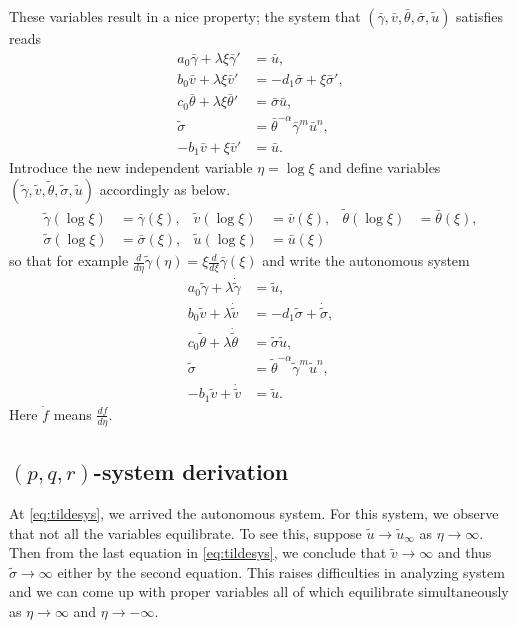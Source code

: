 \documentclass[a4paper,11pt]{article}
\def\bg{{\bar{\gamma}}}
\def\bv{{\bar{v}}}
\def\bth{{\bar{\theta}}}
\def\bs{{\bar{\sigma}}}
\def\bu{{\bar{u}}}
\def\tg{{\tilde{\gamma}}}
\def\tv{{\tilde{v}}}
\def\tth{{\tilde{\theta}}}
\def\ts{{\tilde{\sigma}}}
\def\tu{{\tilde{u}}}
\def\dtg{{\dot{\tilde{\gamma}}}}
\def\dtv{{\dot{\tilde{v}}}}
\def\dtth{{\dot{\tilde{\theta}}}}
\def\dts{{\dot{\tilde{\sigma}}}}
\begin{document}
These variables result in a nice property; the system that $(\bg,\bv,\bth,\bs,\tu)$ satisfies reads
\begin{equation} \label{eq:barsys}
 \begin{aligned}
  a_0\bg + \lambda\xi\bg' &=\bu,\\
  b_0\bv + \lambda\xi\bv' &=-d_1 \bs + \xi\bs',\\
  c_0\bth+ \lambda\xi\bth'&=\bs\bu,\\
  \ts &=\bth^{-\alpha}\bg^m\bu^n,\\
  -b_1\bv+\xi\bv' &= \bu.
 \end{aligned}
\end{equation}
Introduce the new independent variable $\eta = \log\xi$ and define variables $(\tg,\tv,\tth,\ts,\tu)$ accordingly as below.
\begin{equation} \label{eq:BARtoTIL}
\begin{aligned}
 \tg(\log\xi)&=\bg(\xi), &
 \tv(\log\xi)&=\bv(\xi), &
 \tth(\log\xi)&=\bth(\xi), \\
 \ts(\log\xi)&=\bs(\xi), &
 \tu(\log\xi)&=\bu(\xi)
\end{aligned}
\end{equation}
so that for example $\frac{d}{d\eta}\tg(\eta) = \xi \frac{d}{d\xi}\bg(\xi)$ and write the autonomous system
\begin{equation} \label{eq:tildesys}
 \begin{aligned}
  a_0\tg + \lambda\dtg &=\tu,\\
  b_0\tv + \lambda\dtv &=-d_1 \ts + \dts,\\
  c_0\tth+ \lambda\dtth&=\ts\tu,\\
  \ts &=\tth^{-\alpha}\tg^m\tu^n,\\
  -b_1\tv+\dtv &= \tu.
 \end{aligned}
\end{equation}
Here $\dot{f}$ means $\frac{df}{d\eta}$.



\subsection{$(p,q,r)$-system derivation}
At \eqref{eq:tildesys}, we arrived the autonomous system. For this system, we observe that not all the variables equilibrate. To see this, suppose $\tu \rightarrow \tu_\infty$ as $\eta \rightarrow \infty$. Then from the last equation in \eqref{eq:tildesys}, we conclude that $\tv \rightarrow \infty$ and thus $\ts \rightarrow \infty$ either by the second equation. This raises difficulties in analyzing system and we can come up with proper variables all of which equilibrate simultaneously as $\eta \rightarrow \infty$ and $\eta \rightarrow -\infty$.
\end{document}
